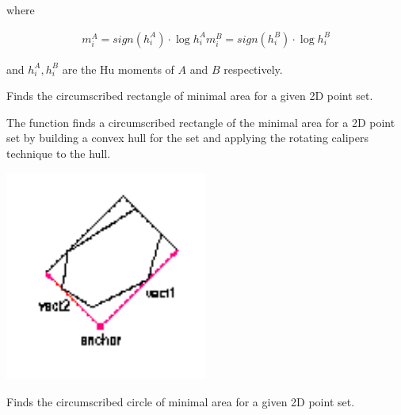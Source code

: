 where

\[
\begin{array}{l}
m^A_i = sign(h^A_i) \cdot \log{h^A_i}
m^B_i = sign(h^B_i) \cdot \log{h^B_i}
\end{array}
\]

and $h^A_i, h^B_i$ are the Hu moments of $A$ and $B$ respectively.


Finds the circumscribed rectangle of minimal area for a given 2D point set.


\begin{description}
\end{description}

The function finds a circumscribed rectangle of the minimal area for a 2D point set by building a convex hull for the set and applying the rotating calipers technique to the hull.


\includegraphics[width=0.5\textwidth]{pics/minareabox.png}

Finds the circumscribed circle of minimal area for a given 2D point set.


